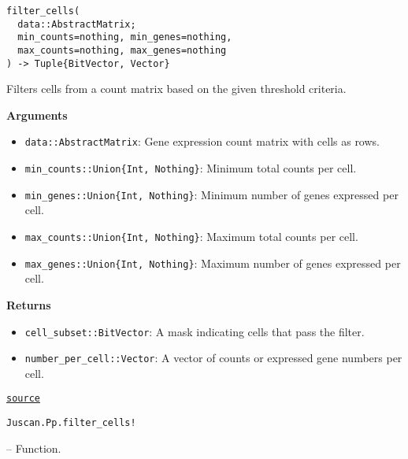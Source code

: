 \documentclass[oneside]{memoir}
\begin{document}
\begin{adjustwidth}{2em}{0pt}
\begin{verbatim}
filter_cells(
  data::AbstractMatrix;
  min_counts=nothing, min_genes=nothing,
  max_counts=nothing, max_genes=nothing
) -> Tuple{BitVector, Vector}
\end{verbatim}

Filters cells from a count matrix based on the given threshold criteria.

\textbf{Arguments}

\begin{itemize}
\item \texttt{data::AbstractMatrix}: Gene expression count matrix with cells as rows.


\item \texttt{min\_counts::Union\{Int, Nothing\}}: Minimum total counts per cell.


\item \texttt{min\_genes::Union\{Int, Nothing\}}: Minimum number of genes expressed per cell.


\item \texttt{max\_counts::Union\{Int, Nothing\}}: Maximum total counts per cell.


\item \texttt{max\_genes::Union\{Int, Nothing\}}: Maximum number of genes expressed per cell.

\end{itemize}
\textbf{Returns}

\begin{itemize}
\item \texttt{cell\_subset::BitVector}: A mask indicating cells that pass the filter.


\item \texttt{number\_per\_cell::Vector}: A vector of counts or expressed gene numbers per cell.

\end{itemize}


\href{https://github.com/zehua0417/Juscan.jl/blob/393ad1b827b678ea98a738f92af658ee9ed9a403/src/preprocessing/filter.jl#L70-L89}{\texttt{source}}


\end{adjustwidth}
\hypertarget{1074066941160685150}{\texttt{Juscan.Pp.filter\_cells!}}  -- {Function.}
\end{document}
